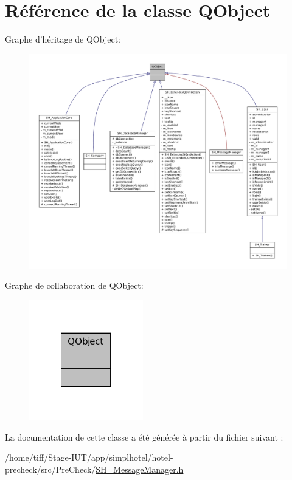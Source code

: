 \hypertarget{classQObject}{\section{Référence de la classe Q\-Object}
\label{classQObject}
}


Graphe d'héritage de Q\-Object\-:\nopagebreak
\begin{figure}[H]
\begin{center}
\leavevmode
\includegraphics[width=350pt]{classQObject__inherit__graph}
\end{center}
\end{figure}


Graphe de collaboration de Q\-Object\-:\nopagebreak
\begin{figure}[H]
\begin{center}
\leavevmode
\includegraphics[width=140pt]{classQObject__coll__graph}
\end{center}
\end{figure}


La documentation de cette classe a été générée à partir du fichier suivant \-:\begin{DoxyCompactItemize}
\item 
/home/tiff/\-Stage-\/\-I\-U\-T/app/simplhotel/hotel-\/precheck/src/\-Pre\-Check/\hyperlink{SH__MessageManager_8h}{S\-H\-\_\-\-Message\-Manager.\-h}\end{DoxyCompactItemize}
